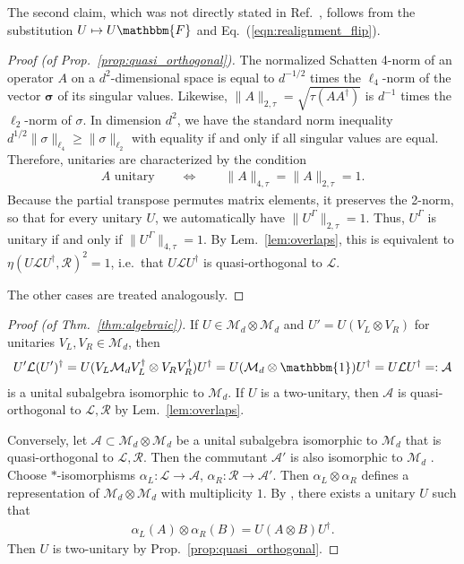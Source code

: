 \documentclass[aps,nofootinbib,floatfix,a4paper]{revtex4}
\newcommand{\1}{\mbox{$\mathbf{1}$}}
\def\FF{\mathbbm{F}}
\def\A{\mathcal{A}}
\def\M{\mathcal{M}}
\def\R{\mathcal{R}}
\def\Id{\mathbbm{1}}
\renewcommand{\vec}{\mathbf}
\begin{document}
The second claim, which was not directly stated in Ref.~\cite{gross2012index}, follows from the substitution $U\mapsto U \FF$ and Eq.~(\ref{eqn:realignment_flip}).


\begin{proof}[Proof \emph{(of Prop.~\ref{prop:quasi_orthogonal})}]
	The normalized Schatten 4-norm of an operator $A$ on a $d^2$-dimensional space is equal to $d^{-1/2}$ times the $\ell_4$-norm of the vector $\vec \sigma$ of its singular values.
	Likewise, $\|A\|_{2,\tau}=\sqrt{\tau(A A^\dagger)}$
	is $d^{-1}$ times the $\ell_2$-norm of $\sigma$.
	In dimension $d^2$, we have the standard norm inequality $d^{1/2} \|\sigma\|_{\ell_4} \geq \| \sigma \|_{\ell_2}$ with equality if and only if all singular values are equal.
	Therefore,
	unitaries  are characterized by the condition 
	\begin{align*}
		A\text{ unitary}
		\qquad\Leftrightarrow\qquad
		\|A\|_{4,\tau}
		=
		\|A\|_{2,\tau}
		= 1.
	\end{align*}
	Because the partial transpose permutes matrix elements, it preserves the 2-norm, so that for every unitary $U$, we automatically have $\|U^\Gamma\|_{2,\tau} = 1$.
	Thus, $U^\Gamma$ is unitary if and only if $\|U^\Gamma\|_{4,\tau}=1$.
	By Lem.~\ref{lem:overlaps}, this is equivalent to $\eta(U \mathcal{L} U^\dagger, \R)^2 = 1$, i.e.\ that $U\mathcal{L} U^\dagger$ is quasi-orthogonal to $\mathcal{L}$.

	The other cases are treated analogously.
\end{proof}

\begin{proof}[Proof \emph{(of Thm.~\ref{thm:algebraic})}]
	If $U\in \M_d\otimes \M_d$ and $U'=U(V_L\otimes V_R)$ for unitaries $V_L, V_R\in \M_d$, then 
	\begin{align*}
		U'
		\mathcal{L} 
		(U')^\dagger
		=
		U 
		(V_L \M_d V_L^\dagger\otimes V_R V_R^\dagger)
		U^\dagger
		=
		U (\M_d \otimes \Id) U^\dagger
		=
		U \mathcal{L} U^\dagger
		=:\A
	\end{align*}
	is a unital subalgebra isomorphic to $\M_d$.
	If $U$ is a two-unitary, then $\A$ is quasi-orthogonal to $\mathcal{L}, \R$ by Lem.~\ref{lem:overlaps}.


	Conversely, let $\A\subset \M_d\otimes \M_d$ be a unital subalgebra isomorphic to $\M_d$ that is quasi-orthogonal to $\mathcal{L}, \R$.
	Then the commutant $\A'$ is also isomorphic to $\M_d$ \cite[Lem.~11.8]{takesaki2003theory}.
	Choose $*$-isomorphisms
	$\alpha_L: \mathcal{L}\to\A$,
	$\alpha_R: \mathcal{R}\to\A'$.
	Then $\alpha_L\otimes\alpha_R$ defines a representation of $\M_d\otimes \M_d$ with multiplicity $1$.
	By 
	\cite[Thm.~11.9]{takesaki2003theory},
	there exists a unitary $U$ such that
	\begin{align*}
		\alpha_L(A) \otimes \alpha_R(B)
		=
		U (A \otimes B) U^\dagger
		.
	\end{align*}
	Then $U$ is two-unitary by Prop.~\ref{prop:quasi_orthogonal}.
\end{proof}
\end{document}

